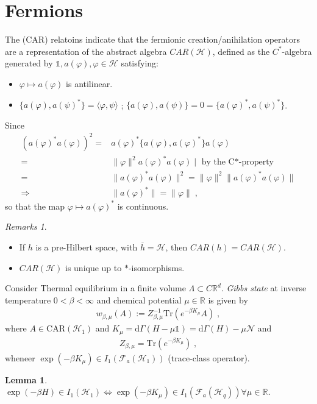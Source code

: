 \documentclass[
a4paper, %
11pt, %
onecolumn, %
openany, %
]{memoir}
\theoremstyle{definition}
\theoremstyle{remark}
\newtheorem{remarks}{Remarks}[chapter]
\theoremstyle{plain}
\newtheorem{lemma}{Lemma}[chapter]
\begin{document}
\section{Fermions}
The (CAR) relatoins indicate that the fermionic creation/anihilation operators are a representation of the abstract algebra $CAR(\mathcal{H})$, defined as the $C^*$-algebra generated by $\mathds{1}, a(\varphi), \varphi\in\mathcal{H}$ satisfying: \begin{itemize}
	\item $\varphi\mapsto a(\varphi)$ is antilinear.
	\item $\{a(\varphi),a(\psi)^*\}=\langle\varphi,\psi\rangle$ ; $\{a(\varphi),a(\psi)\}=0=\{a(\varphi)^*,a(\psi)^*\}$. 
\end{itemize}
Since \begin{align}
(a(\varphi)^*a(\varphi))^2=&a(\varphi)^*\{a(\varphi),a(\varphi)^*\}a(\varphi)\\
=&\|\varphi\|^2a(\varphi)^*a(\varphi)\mid \text{ by the C*-property}\\
=&\|a(\varphi)^*a(\varphi)\|^2=\|\varphi\|^2\|a(\varphi)^*a(\varphi)\|\\
\Rightarrow&\|a(\varphi)^*\|=\|\varphi\|\; ,
\end{align}
so that the map $\varphi\mapsto a(\varphi)^*$ is continuous. \begin{remarks}
	\begin{itemize}
		\item If $h$ is a pre-Hilbert space, with $\overline{h}=\mathcal{H}$, then $CAR(h)=CAR(\mathcal{H})$.
		\item $CAR(\mathcal{H})$ is unique up to $*$-isomorphisms.
	\end{itemize}
\end{remarks}
Consider Thermal equilibrium in a finite volume $\Lambda \subset C\mathbb{R}^d$. \textit{Gibbs state} at inverse temperature $0<\beta<\infty$ and chemical potential $\mu\in\mathbb{R}$ is given by \begin{align}
w_{\beta,\mu}(A):=Z^{-1}_{\beta,\mu} \mathrm{Tr}(e^{-\beta K_{\mu}}A)\; ,
\end{align}
where $A\in \mathrm{CAR}(\mathcal{H}_1)$ and $K_{\mu}=\mathrm{d}\Gamma(H-\mu\mathds{1})=\mathrm{d}\Gamma(H)-\mu\mathcal{N}$ and \begin{align}
Z_{\beta,\mu}=\mathrm{Tr}(e^{-\beta K_{\mu}})\; ,
\end{align}
wheneer $\exp(-\beta K_{\mu})\in I_1(\mathcal{F}_a(\mathcal{H}_1))$ (trace-class operator).
\begin{lemma}
	$\exp(-\beta H)\in I_1(\mathcal{H}_1)\Leftrightarrow \exp(-\beta K_{\mu})\in I_1(\mathcal{F}_a(\mathcal{H}_q))\forall\mu\in \mathbb{R}$.
\end{lemma}
\end{document}
